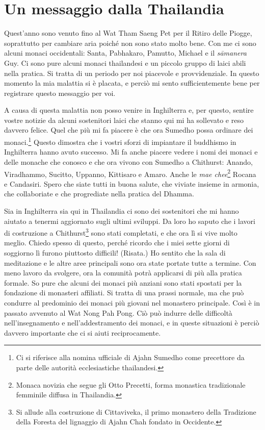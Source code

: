 \chapter{Un messaggio dalla Thailandia}

Quest'anno sono venuto fino al Wat Tham Saeng Pet per il Ritiro delle
Piogge, soprattutto per cambiare aria poiché non sono stato molto bene.
Con me ci sono alcuni monaci occidentali: Santa, Pabhakaro, Pamutto,
Michael e il \emph{sāmanera} Guy. Ci sono pure alcuni monaci thailandesi
e un piccolo gruppo di laici abili nella pratica. Si tratta di un
periodo per noi piacevole e provvidenziale. In questo momento la mia
malattia si è placata, e perciò mi sento sufficientemente bene per
registrare questo messaggio per voi.

A causa di questa malattia non posso venire in Inghilterra e, per
questo, sentire vostre notizie da alcuni sostenitori laici che stanno
qui mi ha sollevato e reso davvero felice. Quel che più mi fa piacere è
che ora Sumedho possa ordinare dei monaci.\footnote{Ci si riferisce alla
  nomina ufficiale di Ajahn Sumedho come precettore da parte delle
  autorità ecclesiastiche thailandesi.} Questo dimostra che i vostri
sforzi di impiantare il buddhismo in Inghilterra hanno avuto successo.
Mi fa anche piacere vedere i nomi dei monaci e delle monache che conosco
e che ora vivono con Sumedho a Chithurst: Anando, Viradhammo, Sucitto,
Uppanno, Kittisaro e Amaro. Anche le \emph{mae chee}\footnote{Monaca
  novizia che segue gli Otto Precetti, forma monastica tradizionale
  femminile diffusa in Thailandia.} Rocana e Candasiri. Spero che siate
tutti in buona salute, che viviate insieme in armonia, che collaboriate
e che progrediate nella pratica del Dhamma.

Sia in Inghilterra sia qui in Thailandia ci sono dei sostenitori che mi
hanno aiutato a tenermi aggiornato sugli ultimi sviluppi. Da loro ho
saputo che i lavori di costruzione a Chithurst\footnote{Si allude alla
  costruzione di Cittaviveka, il primo monastero della Tradizione della
  Foresta del lignaggio di Ajahn Chah fondato in Occidente.} sono stati
completati, e che ora lì si vive molto meglio. Chiedo spesso di questo,
perché ricordo che i miei sette giorni di soggiorno lì furono piuttosto
difficili! (Risata.) Ho sentito che la sala di meditazione e le altre
aree principali sono ora state portate tutte a termine. Con meno lavoro
da svolgere, ora la comunità potrà applicarsi di più alla pratica
formale. So pure che alcuni dei monaci più anziani sono stati spostati
per la fondazione di monasteri affiliati. Si tratta di una prassi
normale, ma che può condurre al predominio dei monaci più giovani nel
monastero principale. Così è in passato avvenuto al Wat Nong Pah Pong.
Ciò può indurre delle difficoltà nell'insegnamento e nell'addestramento
dei monaci, e in queste situazioni è perciò davvero importante che ci si
aiuti reciprocamente.

